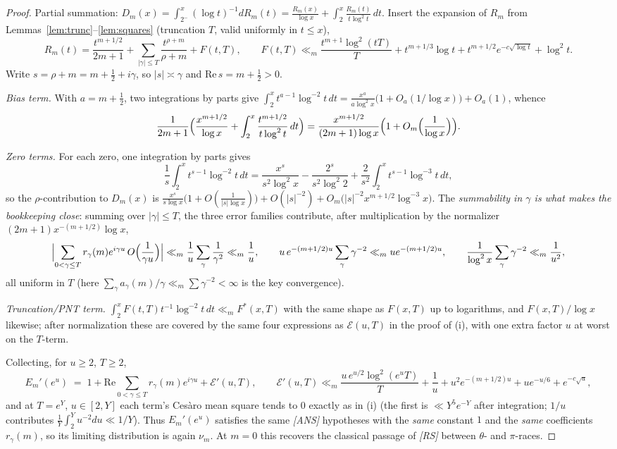 \begin{proof}
Partial summation: $D_m(x)=\int_{2^-}^x(\log t)^{-1}dR_m(t)
=\frac{R_m(x)}{\log x}+\int_2^x\frac{R_m(t)}{t\log^2t}\,dt$. Insert
the expansion of $R_m$ from Lemmas~\ref{lem:trunc}--\ref{lem:squares}
(truncation $T$, valid uniformly in $t\le x$),
\[
R_m(t)=\frac{t^{m+1/2}}{2m+1}
+\sum_{|\gamma|\le T}\frac{t^{\rho+m}}{\rho+m}+F(t,T),
\qquad
F(t,T)\ll_m \frac{t^{m+1}\log^2(tT)}{T}+t^{m+1/3}\log t
+t^{m+1/2}e^{-c\sqrt{\log t}}+\log^2 t .
\]
Write $s=\rho+m=m+\tfrac12+i\gamma$, so $|s|\asymp\gamma$ and
$\mathrm{Re}\,s=m+\tfrac12>0$.

\emph{Bias term.} With $a=m+\tfrac12$, two integrations by parts give
$\int_2^x t^{a-1}\log^{-2}t\,dt=\frac{x^a}{a\log^2x}
\bigl(1+O_a(1/\log x)\bigr)+O_a(1)$, whence
\[
\frac{1}{2m+1}\Bigl(\frac{x^{m+1/2}}{\log x}
+\int_2^x\frac{t^{m+1/2}}{t\log^2t}\,dt\Bigr)
=\frac{x^{m+1/2}}{(2m+1)\log x}
\Bigl(1+O_m\Bigl(\frac1{\log x}\Bigr)\Bigr).
\]

\emph{Zero terms.} For each zero, one integration by parts gives
\[
\frac1s\int_2^x t^{s-1}\log^{-2}t\,dt
=\frac{x^{s}}{s^{2}\log^{2}x}
-\frac{2^{s}}{s^{2}\log^{2}2}
+\frac{2}{s^{2}}\int_2^x t^{s-1}\log^{-3}t\,dt ,
\]
so the $\rho$-contribution to $D_m(x)$ is
$\frac{x^{s}}{s\log x}\bigl(1+O(\tfrac1{|s|\log x})\bigr)
+O(|s|^{-2})+O_m\bigl(|s|^{-2}x^{m+1/2}\log^{-3}x\bigr)$. The
\emph{summability in $\gamma$ is what makes the bookkeeping close}:
summing over $|\gamma|\le T$, the three error families contribute,
after multiplication by the normalizer
$(2m+1)x^{-(m+1/2)}\log x$,
\[
\Bigl|\sum_{0<\gamma\le T}r_\gamma(m)e^{i\gamma u}\,
O\Bigl(\frac1{\gamma u}\Bigr)\Bigr|
\ll_m\frac1u\sum_{\gamma}\frac{1}{\gamma^{2}}\ll_m\frac1u,
\qquad
u\,e^{-(m+1/2)u}\sum_\gamma\gamma^{-2}\ll_m ue^{-(m+1/2)u},
\qquad
\frac{1}{\log^{2}x}\sum_\gamma\gamma^{-2}\ll_m\frac1{u^{2}} ,
\]
all uniform in $T$ (here $\sum_\gamma a_\gamma(m)/\gamma
\ll_m\sum\gamma^{-2}<\infty$ is the key convergence).

\emph{Truncation/PNT term.} $\int_2^x F(t,T)t^{-1}\log^{-2}t\,dt
\ll_m F^*(x,T)$ with the same shape as $F(x,T)$ up to logarithms, and
$F(x,T)/\log x$ likewise; after normalization these are covered by the
same four expressions as $\mathcal E(u,T)$ in the proof of (i), with
one extra factor $u$ at worst on the $T$-term.

Collecting, for $u\ge2$, $T\ge2$,
\[
E_m'(e^u)\;=\;1+\mathrm{Re}\!\!\sum_{0<\gamma\le T}\!\!
r_\gamma(m)e^{i\gamma u}+\mathcal E'(u,T),
\qquad
\mathcal E'(u,T)\ll_m
\frac{u\,e^{u/2}\log^2(e^uT)}{T}+\frac1u+u^2e^{-(m+1/2)u}
+ue^{-u/6}+e^{-c\sqrt u},
\]
and at $T=e^Y$, $u\in[2,Y]$ each term's Ces\`aro mean square tends to
$0$ exactly as in (i) (the first is $\ll Y^5e^{-Y}$ after
integration; $1/u$ contributes $\frac1Y\int_2^Y u^{-2}du\ll1/Y$).
Thus $E_m'(e^u)$ satisfies the same \emph{[ANS]} hypotheses with the
\emph{same} constant $1$ and the \emph{same} coefficients
$r_\gamma(m)$, so its limiting distribution is again $\nu_m$. At
$m=0$ this recovers the classical passage of \emph{[RS]} between
$\theta$- and $\pi$-races.
\end{proof}

